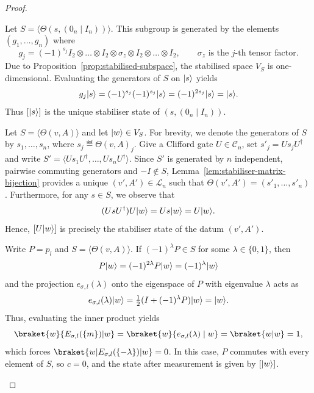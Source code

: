 \documentclass[a4paper, oneside, 12pt]{amsart}
\begin{document}
\begin{proof}
  \begin{thmlist}
    \item Let \(S = \langle \Theta(s, (0_{n}\mid I_{n})) \rangle\).
    This subgroup is generated by the elements \((g_{1}, \dots , g_{n})\) where
    \begin{equation*}
      g_{j} = (-1)^{s_{j}} I_{2}\otimes \dots\otimes I_{2}\otimes \sigma_{z} \otimes I_{2}\otimes \dots \otimes I_{2}, \qquad \text{\(\sigma_{z}\) is the \(j\)-th tensor factor}.
    \end{equation*}
    Due to Proposition~\ref{prop:stabilised-subspace}, the stabilised space \(V_{S}\) is one-dimensional.
    Evaluating the generators of \(S\) on \(\lvert s\rangle\) yields
    \begin{equation*}
      g_{j} \lvert s\rangle = (-1)^{s_j} (-1)^{s_j} \lvert s\rangle = (-1)^{2s_{j}}\lvert s\rangle = \lvert s\rangle.
    \end{equation*}
    Thus \([\lvert s\rangle]\) is the unique stabiliser state of \((s, (0_n \mid I_n))\).

    \item Let \(S = \langle \Theta(v,A) \rangle\) and let \(\lvert w\rangle \in V_S\).
    For brevity, we denote the generators of \(S\) by \(s_{1}, \dots , s_{n}\), where \(s_{j}\eqdef \Theta(v,A)_{j}\).
    Give a Clifford gate \(U \in \mathcal{C}_n\), set \(s'_{j} = U s_{j} U^{\dagger}\) and write \(S' =  \langle U s_1 U^\dagger, \dots, U s_n U^\dagger \rangle\).
    Since \(S'\) is generated by \(n\) independent, pairwise commuting generators and \(-I\notin S\), Lemma~\ref{lem:stabiliser-matrix-bijection} provides a unique \((v', A') \in \mathcal{L}_n\) such that \(\Theta(v', A' ) = (s'_{1}, \dots , s'_{n})\).
    Furthermore, for any \(s \in S\), we observe that
    \begin{equation*}
      (U s U^\dagger) U\lvert w\rangle = U s \lvert w\rangle = U\lvert w\rangle.
    \end{equation*}
    Hence, \([U\lvert w\rangle]\) is precisely the stabiliser state of the datum \((v', A')\).

    \item Write \(P = p_l\) and \(S = \langle \Theta(v,A) \rangle\).
    If \((-1)^\lambda P \in S\) for some \(\lambda \in \{0,1\}\), then
    \begin{equation*}
      P \lvert w\rangle = (-1)^{2\lambda}P \lvert w\rangle = (-1)^\lambda \lvert w\rangle
    \end{equation*}
    and the projection \(e_{\sigma,l}(\lambda)\) onto the eigenspace of \(P\) with eigenvalue \(\lambda\) acts as
    \begin{equation*}
      e_{\sigma,l}(\lambda) \lvert w\rangle = \tfrac{1}{2}(I + (-1)^\lambda P)\lvert w\rangle = \lvert w\rangle.
    \end{equation*}
    Thus, evaluating the inner product yields
    \begin{equation*}
      \braket{w}{ E_{\sigma,l}(\{m\}) | w} = \braket{w}{e_{\sigma,l}(\lambda) \mid w} =  \braket{w|w} = 1,
    \end{equation*}
    which forces \(\braket{w | E_{\sigma,l}(\{-\lambda\}) | w} = 0\).
    In this  case, \(P\) commutes with every element of \(S\), so \(c = 0\), and the state after measurement is given by \([\lvert w\rangle]\).


\end{thmlist}
\end{proof}
\end{document}
